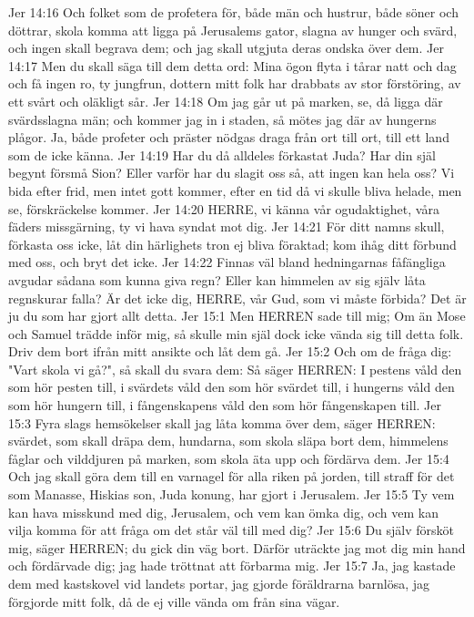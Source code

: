 Jer 14:16  Och folket som de profetera för, både män och hustrur, både söner och döttrar, skola komma att ligga på Jerusalems gator, slagna av hunger och svärd, och ingen skall begrava dem; och jag skall utgjuta deras ondska över dem.
Jer 14:17  Men du skall säga till dem detta ord: Mina ögon flyta i tårar natt och dag och få ingen ro, ty jungfrun, dottern mitt folk har drabbats av stor förstöring, av ett svårt och oläkligt sår.
Jer 14:18  Om jag går ut på marken, se, då ligga där svärdsslagna män; och kommer jag in i staden, så mötes jag där av hungerns plågor. Ja, både profeter och präster nödgas draga från ort till ort, till ett land som de icke känna.
Jer 14:19  Har du då alldeles förkastat Juda? Har din själ begynt försmå Sion? Eller varför har du slagit oss så, att ingen kan hela oss? Vi bida efter frid, men intet gott kommer, efter en tid då vi skulle bliva helade, men se, förskräckelse kommer.
Jer 14:20  HERRE, vi känna vår ogudaktighet, våra fäders missgärning, ty vi hava syndat mot dig.
Jer 14:21  För ditt namns skull, förkasta oss icke, låt din härlighets tron ej bliva föraktad; kom ihåg ditt förbund med oss, och bryt det icke.
Jer 14:22  Finnas väl bland hedningarnas fåfängliga avgudar sådana som kunna giva regn? Eller kan himmelen av sig själv låta regnskurar falla? Är det icke dig, HERRE, vår Gud, som vi måste förbida? Det är ju du som har gjort allt detta.
Jer 15:1  Men HERREN sade till mig; Om än Mose och Samuel trädde inför mig, så skulle min själ dock icke vända sig till detta folk. Driv dem bort ifrån mitt ansikte och låt dem gå.
Jer 15:2  Och om de fråga dig: "Vart skola vi gå?", så skall du svara dem: Så säger HERREN: I pestens våld den som hör pesten till, i svärdets våld den som hör svärdet till, i hungerns våld den som hör hungern till, i fångenskapens våld den som hör fångenskapen till.
Jer 15:3  Fyra slags hemsökelser skall jag låta komma över dem, säger HERREN: svärdet, som skall dräpa dem, hundarna, som skola släpa bort dem, himmelens fåglar och vilddjuren på marken, som skola äta upp och fördärva dem.
Jer 15:4  Och jag skall göra dem till en varnagel för alla riken på jorden, till straff för det som Manasse, Hiskias son, Juda konung, har gjort i Jerusalem.
Jer 15:5  Ty vem kan hava misskund med dig, Jerusalem, och vem kan ömka dig, och vem kan vilja komma för att fråga om det står väl till med dig?
Jer 15:6  Du själv försköt mig, säger HERREN; du gick din väg bort. Därför uträckte jag mot dig min hand och fördärvade dig; jag hade tröttnat att förbarma mig.
Jer 15:7  Ja, jag kastade dem med kastskovel vid landets portar, jag gjorde föräldrarna barnlösa, jag förgjorde mitt folk, då de ej ville vända om från sina vägar.
